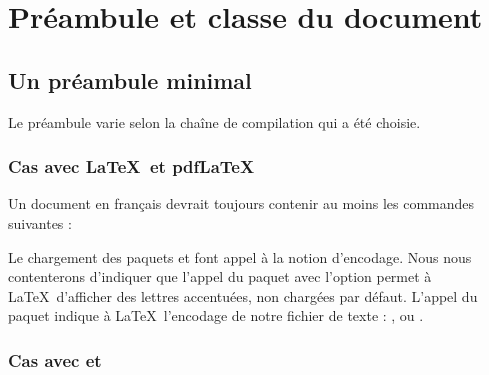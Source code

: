 
\chapter{Préambule et classe du document}
\mtcaddchapter

\label{classe}
\section{Un préambule minimal} 

Le préambule varie selon la chaîne de compilation qui a été choisie.

\subsection{Cas avec \LaTeX\ et pdf\LaTeX}

Un document en français devrait toujours contenir au moins les commandes suivantes :


Le chargement des paquets  et  font appel à la notion d'encodage. Nous nous contenterons d'indiquer que l'appel du paquet  avec l'option  permet à \LaTeX\ d'afficher des lettres accentuées, non chargées par défaut. L'appel du paquet  indique à \LaTeX\ l'encodage de notre fichier de texte : ,  ou .

\subsection{Cas avec \XeLaTeXtitre et \LuaLaTeXtitre} \label{xelualatex}

